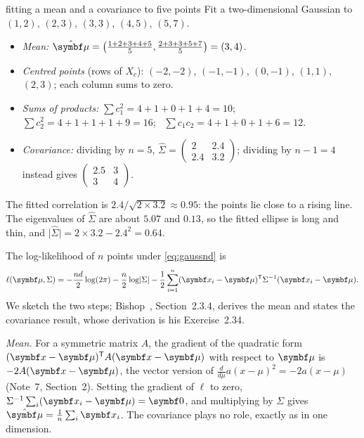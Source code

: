 \documentclass[11pt]{article}
\begin{document}
\begin{worked}{fitting a mean and a covariance to five points}
Fit a two-dimensional Gaussian to $(1, 2)$, $(2, 3)$, $(3, 3)$, $(4, 5)$, $(5, 7)$.
\begin{itemize}
\item \emph{Mean:} $\hat{\vmu} = \big(\frac{1+2+3+4+5}{5}, \frac{2+3+3+5+7}{5}\big) = (3, 4)$.
\item \emph{Centred points} (rows of $X_c$): $(-2, -2)$, $(-1, -1)$, $(0, -1)$, $(1, 1)$, $(2, 3)$; each column sums
to zero.
\item \emph{Sums of products:} $\sum c_1^2 = 4 + 1 + 0 + 1 + 4 = 10$; \ $\sum c_2^2 = 4 + 1 + 1 + 1 + 9 = 16$; \
$\sum c_1c_2 = 4 + 1 + 0 + 1 + 6 = 12$.
\item \emph{Covariance:} dividing by $n = 5$,
$\hat\Sigma = \begin{pmatrix} 2 & 2.4 \\ 2.4 & 3.2 \end{pmatrix}$; dividing by $n - 1 = 4$ instead gives
$\begin{pmatrix} 2.5 & 3 \\ 3 & 4 \end{pmatrix}$.
\end{itemize}
The fitted correlation is $2.4/\sqrt{2 \times 3.2} \approx 0.95$: the points lie close to a rising line. The
eigenvalues of $\hat\Sigma$ are about $5.07$ and $0.13$, so the fitted ellipse is long and thin, and $\lvert\hat\Sigma\rvert
= 2 \times 3.2 - 2.4^2 = 0.64$.
\end{worked}

The log-likelihood of $n$ points under \eqref{eq:gaussnd} is
\[
  \ell(\vmu, \Sigma) = -\frac{nd}{2}\log(2\pi) - \frac{n}{2}\log\lvert\Sigma\rvert
  - \frac12\sum_{i=1}^n (\x_i - \vmu)\T\Sigma^{-1}(\x_i - \vmu) .
\]
We sketch the two steps; Bishop~\cite{bishop2006}, Section~2.3.4, derives the mean and states the covariance
result, whose derivation is his Exercise~2.34.

\emph{Mean.} For a symmetric matrix $A$, the gradient of the quadratic form $(\x - \vmu)\T A(\x - \vmu)$ with respect
to $\vmu$ is $-2A(\x - \vmu)$, the vector version of $\frac{d}{d\mu}a(x - \mu)^2 = -2a(x - \mu)$ (Note~7, Section~2).
Setting the gradient of $\ell$ to zero, $\Sigma^{-1}\sum_i (\x_i - \vmu) = \vect{0}$, and multiplying by $\Sigma$ gives
$\hat{\vmu} = \frac1n\sum_i \x_i$. The covariance plays no role, exactly as in one dimension.
\end{document}
